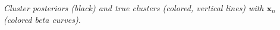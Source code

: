\documentclass{beamer}
\newcommand{\bx}{\ensuremath{\mathbf{x}}}
\begin{document}
\begin{frame}
	\vspace{-0.075in}
  \begin{center}
  \end{center}
  \vspace{-0.20in}
  \hspace{0.3in} \emph{\tiny{Cluster posteriors (black) and true clusters (colored, vertical lines) with $\bx_n$ (colored beta curves).}}
\end{frame}
\end{document}
